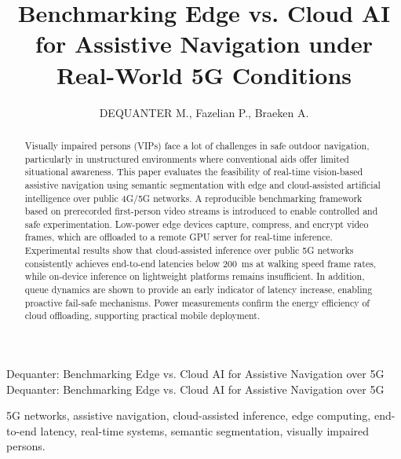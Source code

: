 \documentclass{ieeeaccess}
\begin{document}

\title{Benchmarking Edge vs. Cloud AI for Assistive Navigation under Real-World 5G Conditions}
\author{\uppercase{Dequanter M.}, Fazelian P., Braeken A.}

\address[1]{Erasmushogeschool Brussel, Research Centre for Preventive Health Innovation, Brussels}
\address[2]{Vrije Universiteit Brussel}

\markboth
{Dequanter: Benchmarking Edge vs. Cloud AI for Assistive Navigation over 5G}
{Dequanter: Benchmarking Edge vs. Cloud AI for Assistive Navigation over 5G}




\begin{abstract}
Visually impaired persons (VIPs) face a lot of challenges in safe outdoor navigation, particularly in unstructured environments where conventional aids offer limited situational awareness. This paper evaluates the feasibility of real-time vision-based assistive navigation using semantic segmentation with edge and cloud-assisted artificial intelligence over public 4G/5G networks. A reproducible benchmarking framework based on prerecorded first-person video streams is introduced to enable controlled and safe experimentation. Low-power edge devices capture, compress, and encrypt video frames, which are offloaded to a remote GPU server for real-time inference. Experimental results show that cloud-assisted inference over public 5G networks consistently achieves end-to-end latencies below 200~ms at walking speed frame rates, while on-device inference on lightweight platforms remains insufficient. In addition, queue dynamics are shown to provide an early indicator of latency increase, enabling proactive fail-safe mechanisms. Power measurements confirm the energy efficiency of cloud offloading, supporting practical mobile deployment.

\end{abstract}


\begin{keywords}
5G networks, assistive navigation, cloud-assisted inference, edge computing, end-to-end latency, real-time systems, semantic segmentation, visually impaired persons.
\end{keywords}
\end{document}
